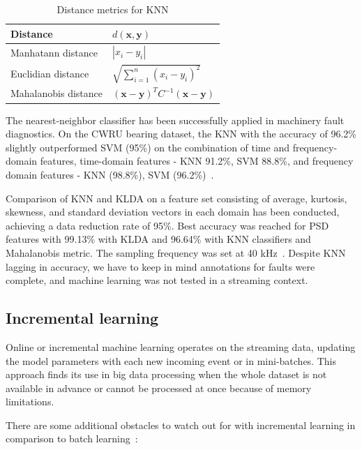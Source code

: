 \begin{table}[ht]
\centering
\renewcommand{\arraystretch}{2}
\begin{tabular}{|l|l|}
\hline
\textbf{Distance}     & \textbf{$d(\mathbf{x}, \mathbf{y})$}                                   \\ \hline
Manhatann distance	 & $ |x_i - y_i| $													   \\ \hline
Euclidian distance    & $ \sqrt{\sum_{i = 1}^{n}(x_i - y_i)^2} $                               \\ \hline
Mahalanobis distance  & $ (\mathbf{x} - \mathbf{y})^T C^{-1} (\mathbf{x} - \mathbf{y}) $       \\ \hline
\end{tabular}
\caption{Distance metrics for KNN}
\label{tab:KNN-distance}
\end{table}

The nearest-neighbor classifier has been successfully applied in machinery fault diagnostics. On the CWRU bearing dataset, the KNN with the accuracy of 96.2\% slightly outperformed SVM (95\%) on the combination of time and frequency-domain features, time-domain features - KNN 91.2\%, SVM 88.8\%, and frequency domain features - KNN (98.8\%), SVM (96.2\%)~\cite{jamil_feature-based_2021}. 

Comparison of KNN and KLDA on a feature set consisting of average, kurtosis, skewness, and standard deviation vectors in each domain has been conducted, achieving a data reduction rate of 95\%. Best accuracy was reached for PSD features with 99.13\% with KLDA and 96.64\% with KNN classifiers and Mahalanobis metric. The sampling frequency was set at 40 kHz~\cite{altaf_new_2022}. Despite KNN lagging in accuracy, we have to keep in mind annotations for faults were complete, and machine learning was not tested in a streaming context.

\subsection{Incremental learning}
Online or incremental machine learning operates on the streaming data, updating the model parameters with each new incoming event or in mini-batches. This approach finds its use in big data processing when the whole dataset is not available in advance or cannot be processed at once because of memory limitations. 

There are some additional obstacles to watch out for with incremental learning in comparison to batch learning~\cite{gepperth_incremental_2016}:

